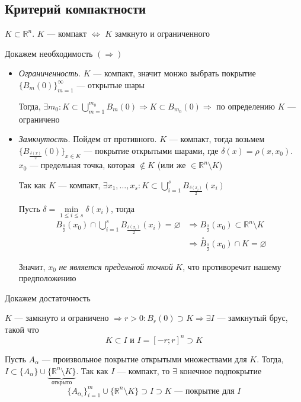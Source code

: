 \documentclass[a4paper, 10pt]{article}
\begin{document}
\subsection{Критерий компактности}
\theorem $K\subset \mathbb{R}^n$. $K$ — компакт $\Longleftrightarrow$ $K$ замкнуто и ограниченного

\proof Докажем необходимость $(\Longrightarrow)$
\begin{itemize}
    \item \textit{Ограниченность.} $K$ — компакт, значит монжо выбрать покрытие $\{B_{m}(0)\}_{m=1}^{\infty}$ — открытые шары
    
    Тогда, $\exists m_0:K\subset \displaystyle\bigcup_{m=1}^{m_0} B_m(0)\Longrightarrow K\subset B_{m_0}(0)\Longrightarrow$ по определению $K$ — ограничено

    \item \textit{Замкнутость.} Пойдем от противного. $K$ — компакт, тогда возьмем $\{B_{\frac{\delta(x)}{2}}(0)\}_{x\in K}$ — покрытие открытыми шарами, где $\delta(x)=\rho(x,x_0)$. $x_0$ — предельная точка, которая $\notin K$ (или же $\in \mathbb{R}^n\setminus K$)
    
    Так как $K$ — компакт, $\exists x_1,\ldots, x_s:K\subset\displaystyle\bigcup_{i=1}^{s} B_{\frac{\delta(x_i)}{2}}(x_i)$

    Пусть $\delta=\min\limits_{1\leqslant i\leqslant s}{\delta(x_i)}$, тогда
    \begin{equation*}
        \begin{aligned}
            B_{\frac{\delta}{2}}(x_0)\cap\bigcup_{i=1}^{s}B_{\frac{\delta(x_i)}{2}}(x_i)=\varnothing&\Longrightarrow B_{\frac{\delta}{2}}(x_0)\subset\mathbb{R}^n\setminus K\\
            &\Longrightarrow\stackrel{\circ}{B}_{\frac{\delta}{2}}(x_0)\cap K=\varnothing
        \end{aligned}
    \end{equation*}

    Значит, $x_0$ \textit{не является предельной точкой} $K$, что противоречит нашему предположению
\end{itemize}

\proof Докажем достаточность

$K$ — замкнуто и ограничено $\Longrightarrow r>0:B_r(0)\supset K\Longrightarrow\exists I$ — замкнутый брус, такой что 
$$K\subset I\text{ и }I=[-r;r]^n\supset K$$

Пусть $A_{\alpha}$ — произвольное покрытие открытыми множествами для $K$. Тогда, $I\subset \{A_{\alpha}\}\cup\underbrace{\{\mathbb{R}^n\setminus K\}}_{\text{открыто}}$. Так как $I$ — компакт, то $\exists $ конечное подпокрытие 
$$\{A_{\alpha_i}\}_{i=1}^m\cup\{\mathbb{R}^n\setminus K\}\supset I\supset K\text{ — покрытие для $I$}$$
\end{document}
